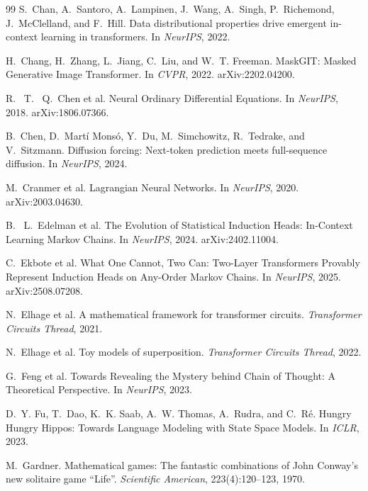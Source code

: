 \documentclass[11pt]{article}
\begin{document}
\begin{thebibliography}{99}
S.~Chan, A.~Santoro, A.~Lampinen, J.~Wang, A.~Singh, P.~Richemond,
J.~McClelland, and F.~Hill.
Data distributional properties drive emergent in-context learning in
transformers. In \emph{NeurIPS}, 2022.

H.~Chang, H.~Zhang, L.~Jiang, C.~Liu, and W.~T. Freeman.
MaskGIT: Masked Generative Image Transformer. In \emph{CVPR}, 2022. arXiv:2202.04200.

R.~ T.~ Q.~Chen et al.
Neural Ordinary Differential Equations. In \emph{NeurIPS}, 2018. arXiv:1806.07366.

B.~Chen, D.~Mart\'i Mons\'o, Y.~Du, M.~Simchowitz, R.~Tedrake, and
V.~Sitzmann.
Diffusion forcing: Next-token prediction meets full-sequence diffusion.
In \emph{NeurIPS}, 2024.

M.~Cranmer et al.
Lagrangian Neural Networks. In \emph{NeurIPS}, 2020. arXiv:2003.04630.

B.~ L.~Edelman et al.
The Evolution of Statistical Induction Heads: In-Context Learning Markov Chains. In \emph{NeurIPS}, 2024. arXiv:2402.11004.

C.~Ekbote et al.
What One Cannot, Two Can: Two-Layer Transformers Provably Represent Induction Heads on Any-Order Markov Chains. In \emph{NeurIPS}, 2025. arXiv:2508.07208.

N.~Elhage et al.
A mathematical framework for transformer circuits.
\emph{Transformer Circuits Thread}, 2021.

N.~Elhage et al.
Toy models of superposition. \emph{Transformer Circuits Thread}, 2022.

G.~Feng et al.
Towards Revealing the Mystery behind Chain of Thought: A Theoretical Perspective. In \emph{NeurIPS}, 2023.

D.~Y. Fu, T.~Dao, K.~K. Saab, A.~W. Thomas, A.~Rudra, and C.~R\'e.
Hungry Hungry Hippos: Towards Language Modeling with State Space Models. In \emph{ICLR}, 2023.

M.~Gardner.
Mathematical games: The fantastic combinations of John Conway's new solitaire
game ``Life''. \emph{Scientific American}, 223(4):120--123, 1970.


\end{thebibliography}
\end{document}
